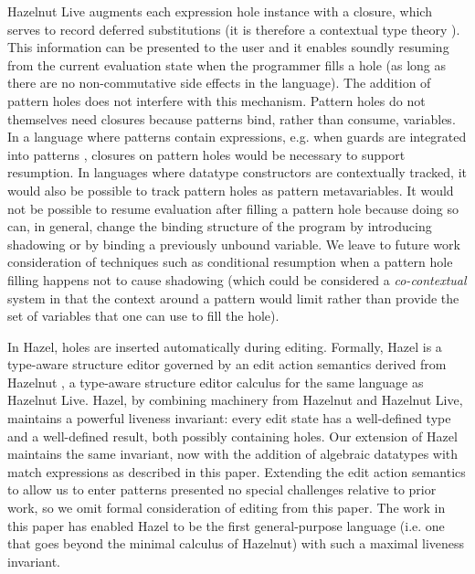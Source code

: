 Hazelnut Live augments each expression hole instance with a closure, which serves to record deferred substitutions 
(it is therefore a contextual type theory \cite{DBLP:journals/tocl/NanevskiPP08}). This information can be presented to the user and it enables soundly resuming from the current evaluation state when the programmer fills a hole (as long as there are no non-commutative side effects in the language).
The addition of pattern holes does not interfere with this mechanism. Pattern holes do not themselves need closures because patterns bind,
rather than consume, variables. In a language where patterns contain expressions, e.g. when guards are integrated into patterns \cite{Reppy2019}, closures on pattern holes would be necessary to support resumption. In languages where datatype constructors are contextually tracked, it would also be possible to track pattern holes as pattern metavariables. It would not be possible to resume evaluation after filling a pattern hole because doing so can, in general, change the binding structure of the program by introducing shadowing or by binding a previously unbound variable. We leave to future work consideration of techniques such as 
conditional resumption when a pattern hole filling happens not to cause shadowing (which could be considered a \emph{co-contextual} system in that the context around a pattern would limit rather than provide the set of variables that one can use to fill the hole).

In Hazel, holes are inserted automatically during editing. Formally, Hazel is a type-aware structure editor governed by an edit action semantics derived from Hazelnut \cite{DBLP:conf/popl/OmarVHAH17}, a type-aware structure editor calculus 
for the same language as Hazelnut Live. 
Hazel, by combining machinery from Hazelnut and Hazelnut Live, maintains a powerful liveness invariant: every edit state has a well-defined type
and a well-defined result, both possibly containing holes.
Our extension of Hazel maintains the same invariant, now with the addition of algebraic datatypes with match expressions 
as described in this paper. 
Extending the edit action semantics to allow us to enter patterns presented no special challenges relative to prior work, so we omit formal consideration of editing from this paper. The work in this paper has enabled Hazel to be the first general-purpose language (i.e. one that goes beyond the minimal calculus of Hazelnut) with such a maximal liveness invariant.

